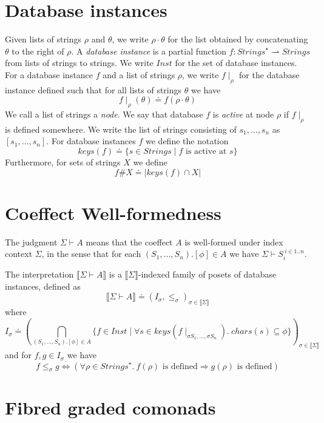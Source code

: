 \documentclass{article}
\newcommand{\sem}[1]{\llbracket #1 \rrbracket}
\newcommand{\sdisp}[1]{
\left( #1 \right)
}
\begin{document}
\section*{Database instances}

Given lists of strings $\rho$ and $\theta$, we write $\rho \cdot \theta$ for the list obtained by concatenating $\theta$ to the right of $\rho$. A \emph{database instance} is a partial function $f : \mathit{Strings}^{\star} \rightharpoonup \mathit{Strings}$ from lists of strings to strings. We write $\mathit{Inst}$ for the set of database instances. For a database instance $f$ and a list of strings $\rho$, we write $f \! \mid_\rho$ for the database instance defined such that for all lists of strings $\theta$ we have $$f \! \mid_\rho \! (\theta) \doteq f(\rho \cdot \theta)$$ We call a list of strings a \emph{node}. We say that database $f$ is \emph{active} at node $\rho$ if $f \! \mid_\rho$ is defined somewhere. We write the list of strings consisting of $s_1, \ldots, s_n$ as $[s_1,\ldots,s_n]$. For database instances $f$ we define the notation $$\mathit{keys}(f) \doteq \{ s \in \mathit{Strings} \mid f \text{ is active at } s \}$$ Furthermore, for sets of strings $X$ we define
$$f \# X \doteq | \mathit{keys}(f) \cap X |$$ 


\section*{Coeffect Well-formedness}

The judgment $\Sigma \vdash A$ means that the coeffect $A$ is well-formed under index context $\Sigma$,
in the sense that for each $(S_1,\ldots,S_n).[\phi] \in A$ we have $\Sigma \vdash S_i^{~i \in 1..n}$.

The interpretation $\sem{\Sigma \vdash A}$ is a $\sem{\Sigma}$-indexed family of posets of database instances, defined as $$\sem{\Sigma \vdash A} \doteq (I_\sigma, \leq_\sigma)_{\sigma \in \sem{\Sigma}}$$ where $$I_\sigma \doteq \sdisp{\bigcap_{(S_1,\ldots,S_n).[\phi] \in A} \{ f \in \mathit{Inst} \mid \forall s \in \mathit{keys}(f \! \mid_{\sigma S_1, \ldots, \sigma S_n}).~\mathit{chars}(s) \subseteq \phi \}}_{\sigma \in \sem{\Sigma}}$$ and for $f,g \in I_{\sigma}$ we have
$$f \leq_\sigma g \overset{\cdot}{\Leftrightarrow} (\forall \rho \in \mathit{Strings}^\star.~f(\rho) \text{ is defined} \Rightarrow g(\rho) \text{ is defined})$$
 

\section*{Fibred graded comonads}
 
\end{document}
